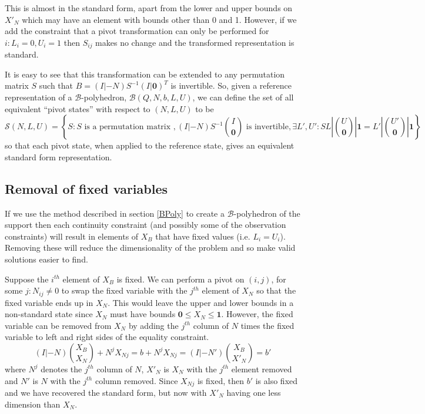 \documentclass{article}
\begin{document}
This is almost in the standard form, apart from the lower and upper bounds on $X'_N$ which may have an element with bounds other than 0 and 1. However, if we add the constraint that a pivot transformation can only be performed for $i: L_i = 0, U_i=1$ then $S_{ij}$ makes no change and the transformed representation is standard.

It is easy to see that this transformation can be extended to any permutation matrix $S$ such that $B = (I|-N)S^{-1}(I|\mathbf{0})^T$ is invertible. So, given a reference representation of a $\mathcal{B}$-polyhedron, $\mathcal{B}(Q,N,b,L,U)$, we can define the set of all equivalent ``pivot states'' with respect to $(N,L,U)$ to be
\[
\mathcal{S}(N,L,U) = \left\{S : S \text{ is a permutation matrix }, (I|-N)S^{-1}{I\choose \mathbf{0}} \text{ is invertible}, \exists L',U': S{L|U \choose \mathbf{0}|\mathbf{1}} = {L'|U' \choose \mathbf{0}|\mathbf{1}} \right\}
\]
so that each pivot state, when applied to the reference state, gives an equivalent standard form representation.

\subsection{Removal of fixed variables}

If we use the method described in section \ref{BPoly} to create a $\mathcal{B}$-polyhedron of the support then each continuity constraint (and possibly some of the observation constraints) will result in elements of $X_B$ that have fixed values (i.e. $L_i = U_i$). Removing these will reduce the dimensionality of the problem and so make valid solutions easier to find.

Suppose the $i^{th}$ element of $X_B$ is fixed. We can perform a pivot on $(i,j)$, for some $j:N_{ij}\ne 0$ to swap the fixed variable with the $j^{th}$ element of $X_N$ so that the fixed variable ends up in $X_N$. This would leave the upper and lower bounds in a non-standard state since $X_N$ must have bounds $\mathbf{0} \le X_N \le \mathbf{1}$. However, the fixed variable can be removed from $X_N$ by adding the $j^{th}$ column of $N$ times the fixed variable to left and right sides of the equality constraint.
\[
(I|-N){X_B \choose X_N} + N^jX_{Nj} = b + N^jX_{Nj} = (I|-N'){X_B \choose X'_N} = b'
\]
where $N^j$ denotes the $j^{th}$ column of $N$, $X'_N$ is $X_N$ with the $j^{th}$ element removed and $N'$ is $N$ with the $j^{th}$ column removed. Since $X_{Nj}$ is fixed, then $b'$ is also fixed and we have recovered the standard form, but now with $X'_N$ having one less dimension than $X_N$.
\end{document}
